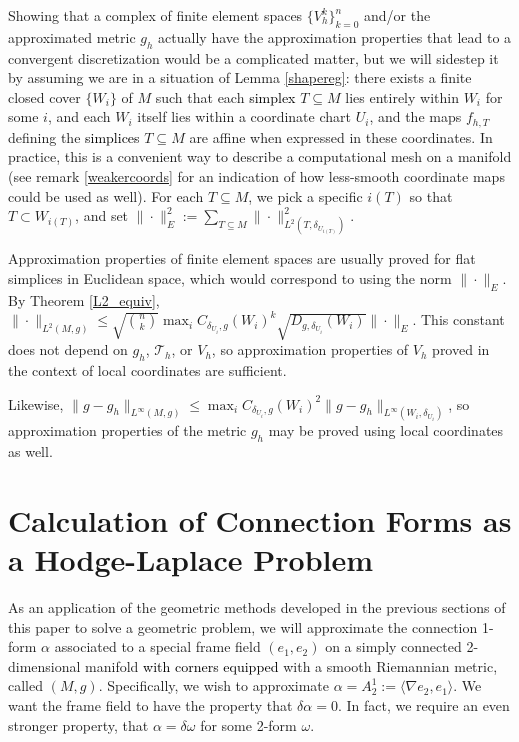 \documentclass[11pt]{article}
\newcommand{\iprod}[1]{\langle #1 \rangle}
\newcommand{\correction}[2]{\textcolor{red}{}\textcolor{black}{#2}}
\begin{document}
Showing that a complex of finite element spaces $\{V_h^k\}_{k=0}^n$ and/or the approximated metric $g_h$ actually have the approximation properties that lead to a convergent discretization would be a complicated matter, but we will sidestep it by assuming we are in a situation of Lemma \ref{shapereg}: there exists a finite closed cover $\{W_i\}$ of $M$ such that each \correction{triangle}{simplex} $T \subseteq M$ lies entirely within $W_i$ for some $i$, and each $W_i$ itself lies within a coordinate chart $U_i$, and the maps $f_{h,T}$ defining the \correction{triangles}{simplices} $T \subseteq M$ are affine when expressed in these coordinates. In practice, this is a convenient way to describe a computational mesh on a manifold (see remark \ref{weakercoords} for an indication of how less-smooth coordinate maps could be used as well). For each $T \subseteq M$, we pick a specific $i(T)$ so that $T \subset W_{i(T)}$, and set $\|\cdot\|_E^2 := \sum_{T \subseteq M} \|\cdot\|_{L^2(T,\delta_{U_{i(T)}})}^2$. 

Approximation properties of finite element spaces are usually proved for flat simplices in Euclidean space, which would correspond to using the norm $\|\cdot\|_E$. By Theorem \ref{L2_equiv}, \\$\|\cdot\|_{L^2(M,g)} \le \sqrt{n \choose k}\max_iC_{\delta_{U_i},g}(W_i)^k\sqrt{D_{g,\delta_{U_i}}(W_i)}\|\cdot\|_E$. This constant does not depend on $g_h$, $\mathcal{T}_h$, or $V_h$, so approximation properties of $V_h$ proved in the context of local coordinates are sufficient.

Likewise, $\|g - g_h\|_{L^\infty(M,g)} \le \max_iC_{\delta_{U_i},g}(W_i)^2\|g - g_h\|_{L^\infty(W_i,\delta_{U_i})}$, so approximation properties of the metric $g_h$ may be proved using local coordinates as well.

\section{Calculation of Connection Forms as a Hodge-Laplace Problem}

As an application of the geometric methods developed in the previous sections of this paper to solve a geometric problem, we will approximate the connection 1-form $\alpha$ associated to a special frame field $(e_1,e_2)$ on a simply connected 2-dimensional manifold \correction{}{with corners equipped} with a smooth Riemannian metric, called $(M,g)$. Specifically, we wish to approximate $\alpha = A^1_2 := \iprod{\nabla e_2, e_1}$. We want the frame field to have the property that $\delta \alpha = 0$. In fact, we require an even stronger property, that $\alpha = \delta \omega$ for some 2-form $\omega$.
\end{document}
